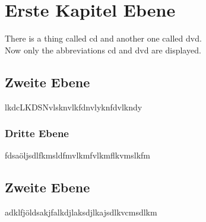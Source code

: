 \chapter{Erste Kapitel Ebene}
There is a thing called \gls{cd} and another one called \gls{dvd}.\\
Now only the abbreviations \gls{cd} and \gls{dvd} are displayed.

\section{Zweite Ebene}
lkdcLKDSNvlsknvlkfdnvlyknfdvlkndy

\subsection{Dritte Ebene}
fdsaöljsdlfkmsldfmvlkmfvlkmflkvmslkfm

\section{Zweite Ebene}
adklfjöldsakjfalkdjlaksdjlkajsdlkvcmsdlkm